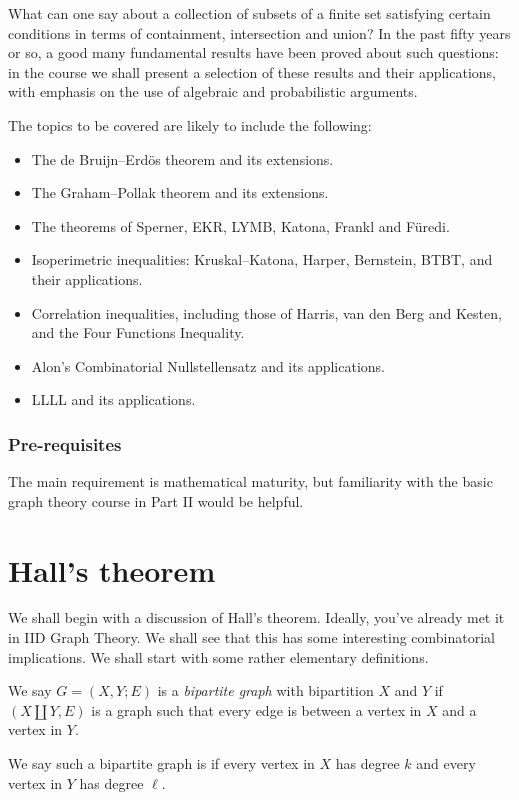 \documentclass[a4paper]{article}
\begin{document}
\maketitle
{\small
\setlength{\parindent}{0em}
\setlength{\parskip}{1em}

What can one say about a collection of subsets of a finite set satisfying certain conditions in terms of containment, intersection and union? In the past fifty years or so, a good many fundamental results have been proved about such questions: in the course we shall present a selection of these results and their applications, with emphasis on the use of algebraic and probabilistic arguments.

The topics to be covered are likely to include the following:
\begin{itemize}
 \item The de Bruijn--Erd\"os theorem and its extensions.
 \item The Graham--Pollak theorem and its extensions.
 \item The theorems of Sperner, EKR, LYMB, Katona, Frankl and F\"uredi. %
 \item Isoperimetric inequalities: Kruskal--Katona, Harper, Bernstein, BTBT, and their applications.
 \item Correlation inequalities, including those of Harris, van den Berg and Kesten, and the Four Functions Inequality.
 \item Alon's Combinatorial Nullstellensatz and its applications.
 \item LLLL and its applications.
\end{itemize}

\subsubsection*{Pre-requisites}
The main requirement is mathematical maturity, but familiarity with the basic graph theory course in Part II would be helpful.
}
\tableofcontents

\section{Hall's theorem}
We shall begin with a discussion of Hall's theorem. Ideally, you've already met it in IID Graph Theory. We shall see that this has some interesting combinatorial implications. We shall start with some rather elementary definitions.

\begin{defi}
  We say $G = (X, Y; E)$ is a \emph{bipartite graph} with bipartition $X$ and $Y$ if $(X \coprod Y, E)$ is a graph such that every edge is between a vertex in $X$ and a vertex in $Y$.

  We say such a bipartite graph is  if every vertex in $X$ has degree $k$ and every vertex in $Y$ has degree $\ell$.
\end{defi}
\end{document}

